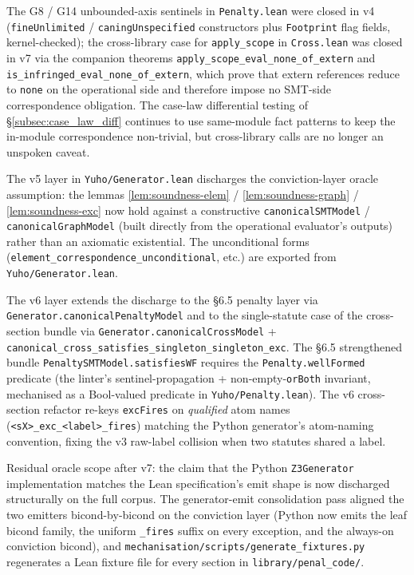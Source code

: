 The G8 / G14 unbounded-axis sentinels in \texttt{Penalty.lean}
were closed in v4 (\texttt{fineUnlimited} /
\texttt{caningUnspecified} constructors plus
\texttt{Footprint} flag fields, kernel-checked); the
cross-library case for \texttt{apply\_scope} in
\texttt{Cross.lean} was closed in v7 via the companion theorems
\texttt{apply\_scope\_eval\_none\_of\_extern} and
\texttt{is\_infringed\_eval\_none\_of\_extern}, which prove
that extern references reduce to \texttt{none} on the
operational side and therefore impose no SMT-side
correspondence obligation. The case-law differential testing
of \S\ref{subsec:case_law_diff} continues to use same-module
fact patterns to keep the in-module correspondence
non-trivial, but cross-library calls are no longer an
unspoken caveat.

The v5 layer in \texttt{Yuho/Generator.lean} discharges the
conviction-layer oracle assumption: the lemmas
\ref{lem:soundness-elem} / \ref{lem:soundness-graph} /
\ref{lem:soundness-exc} now hold against a constructive
\texttt{canonicalSMTModel} / \texttt{canonicalGraphModel} (built
directly from the operational evaluator's outputs) rather than
an axiomatic existential. The unconditional forms
(\texttt{element\_correspondence\_unconditional}, etc.) are
exported from \texttt{Yuho/Generator.lean}.

The v6 layer extends the discharge to the §6.5 penalty layer
via \texttt{Generator.canonicalPenaltyModel} and to the
single-statute case of the cross-section bundle via
\texttt{Generator.canonicalCrossModel} +
\texttt{canonical\_cross\_satisfies\_singleton\_singleton\_exc}.
The §6.5 strengthened bundle
\texttt{PenaltySMTModel.satisfiesWF} requires the
\texttt{Penalty.wellFormed} predicate (the linter's
sentinel-propagation + non-empty-\texttt{orBoth} invariant,
mechanised as a Bool-valued predicate in
\texttt{Yuho/Penalty.lean}). The v6 cross-section refactor
re-keys \texttt{excFires} on \emph{qualified} atom names
(\texttt{<sX>\_exc\_<label>\_fires}) matching the Python
generator's atom-naming convention, fixing the v3 raw-label
collision when two statutes shared a label.

Residual oracle scope after v7: the claim that the Python
\texttt{Z3Generator} implementation matches the Lean
specification's emit shape is now discharged structurally on
the full corpus. The generator-emit consolidation pass aligned
the two emitters bicond-by-bicond on the conviction layer
(Python now emits the leaf bicond family, the uniform
\texttt{\_fires} suffix on every exception, and the always-on
conviction bicond), and
\texttt{mechanisation/scripts/generate\_fixtures.py} regenerates
a Lean fixture file for every section in
\texttt{library/penal\_code/}.

